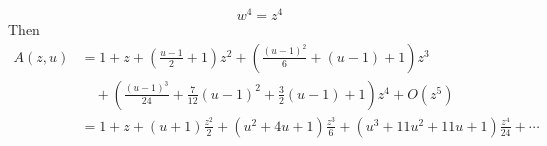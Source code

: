 \begin{equation*}
    w^{4} = z^{4}
\end{equation*}
Then
\begin{equation*}
    \begin{aligned}
        A(z, u)
        &= 1 + z + \left(\frac{u - 1}{2} + 1\right)z^{2} + \left(\frac{(u - 1)^{2}}{6} + (u - 1) + 1\right)z^{3} \\
        &\quad + \left(\frac{(u - 1)^{3}}{24} + \frac{7}{12}(u - 1)^{2} + \frac{3}{2}(u - 1) + 1\right)z^{4} + O(z^{5}) \\
        &= 1 + z + (u + 1)\frac{z^{2}}{2} + (u^{2} + 4u + 1)\frac{z^{3}}{6} + (u^{3} + 11u^{2} + 11u + 1)\frac{z^{4}}{24} + \cdots
    \end{aligned}
\end{equation*}

